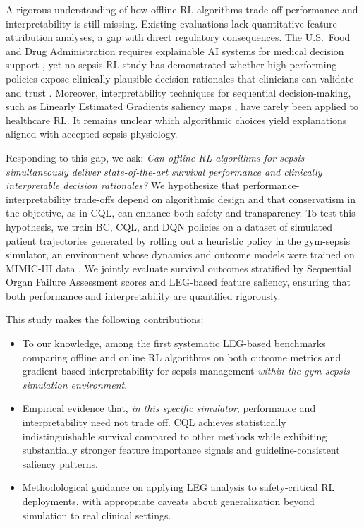 A rigorous understanding of how offline RL algorithms trade off performance and interpretability is still missing. Existing evaluations lack quantitative feature-attribution analyses, a gap with direct regulatory consequences. The U.S.\ Food and Drug Administration requires explainable AI systems for medical decision support \citep{fda2021ai}, yet no sepsis RL study has demonstrated whether high-performing policies expose clinically plausible decision rationales that clinicians can validate and trust \citep{holzinger2017xai_healthcare}. Moreover, interpretability techniques for sequential decision-making, such as Linearly Estimated Gradients saliency maps \citep{greydanus2018leg}, have rarely been applied to healthcare RL. It remains unclear which algorithmic choices yield explanations aligned with accepted sepsis physiology.

Responding to this gap, we ask: \textit{Can offline RL algorithms for sepsis simultaneously deliver state-of-the-art survival performance and clinically interpretable decision rationales?} We hypothesize that performance-interpretability trade-offs depend on algorithmic design and that conservatism in the objective, as in CQL, can enhance both safety and transparency. To test this hypothesis, we train BC, CQL, and DQN policies on a dataset of simulated patient trajectories generated by rolling out a heuristic policy in the gym-sepsis simulator, an environment whose dynamics and outcome models were trained on MIMIC-III data \citep{raghu2017sepsis_drl}. We jointly evaluate survival outcomes stratified by Sequential Organ Failure Assessment scores and LEG-based feature saliency, ensuring that both performance and interpretability are quantified rigorously.

This study makes the following contributions:
\begin{itemize}
    \item To our knowledge, among the first systematic LEG-based benchmarks comparing offline and online RL algorithms on both outcome metrics and gradient-based interpretability for sepsis management \textit{within the gym-sepsis simulation environment}.
    \item Empirical evidence that, \textit{in this specific simulator}, performance and interpretability need not trade off. CQL achieves statistically indistinguishable survival compared to other methods while exhibiting substantially stronger feature importance signals and guideline-consistent saliency patterns.
    \item Methodological guidance on applying LEG analysis to safety-critical RL deployments, with appropriate caveats about generalization beyond simulation to real clinical settings.
\end{itemize}

